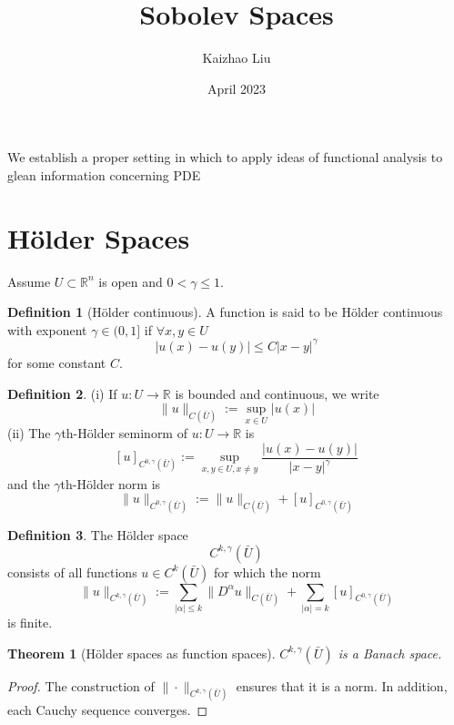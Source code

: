 \documentclass{article}
\title{Sobolev Spaces}
\author{Kaizhao Liu}
\date{April 2023}
\newtheorem{theorem}{Theorem}[section]
\theoremstyle{definition}
\newtheorem{definition}{Definition}[section]
\begin{document}
\maketitle

We establish a proper setting in which to apply ideas of functional analysis to glean information concerning PDE

\tableofcontents

\section{H\"older Spaces}
Assume $U\subset \mathbb{R}^n$ is open and $0<\gamma\le 1$. 
\begin{definition}[H\"older continuous]
    A function is said to be H\"older continuous with exponent $\gamma\in (0,1]$ if $\forall x,y\in U$
    \begin{equation}
        |u(x)-u(y)|\le C|x-y|^\gamma
    \end{equation}
    for some constant $C$.    
\end{definition}

\begin{definition}
    (i) If $u:U\to\mathbb{R}$ is bounded and continuous, we write 
    \[\|u\|_{C(\bar{U})}:=\sup_{x\in U}|u(x)|\] 
    (ii) The $\gamma$th-H\"older seminorm of $u:U\to\mathbb{R}$ is 
    \[[u]_{C^{0,\gamma}(\bar{U})}:=\sup_{x,y\in U,x\ne y} \frac{|u(x)-u(y)|}{|x-y|^\gamma}\] 
    and the $\gamma$th-H\"older norm is 
    \[\|u\|_{C^{0,\gamma}(\bar{U})}:= \|u\|_{C(\bar{U})}+[u]_{C^{0,\gamma}(\bar{U})}\]
\end{definition}

\begin{definition}
    The H\"older space \[C^{k,\gamma}(\bar{U})\] consists of all functions $u\in C^k(\bar{U})$ for which the norm 
    \[ \|u\|_{C^{k,\gamma}(\bar{U})}:= \sum_{|\alpha|\le k}\|D^\alpha u\|_{C(\bar{U})}+\sum_{|\alpha|= k}[u]_{C^{0,\gamma}(\bar{U})}\]
    is finite.
\end{definition}

\begin{theorem}[H\"older spaces as function spaces]
    $C^{k,\gamma}(\bar{U})$ is a Banach space.
\end{theorem}
\begin{proof}
    The construction of $\|\cdot\|_{C^{k,\gamma}(\bar{U})}$ ensures that it is a norm. 
    In addition, each Cauchy sequence converges.
\end{proof}
\end{document}
